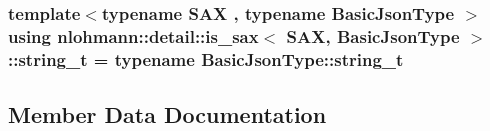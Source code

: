 \subsubsection[{\texorpdfstring{string\+\_\+t}{string_t}}]{\setlength{\rightskip}{0pt plus 5cm}template$<$typename S\+AX , typename Basic\+Json\+Type $>$ using {\bf nlohmann\+::detail\+::is\+\_\+sax}$<$ S\+AX, Basic\+Json\+Type $>$\+::{\bf string\+\_\+t} =  typename Basic\+Json\+Type\+::string\+\_\+t\hspace{0.3cm}{\ttfamily [private]}}\hypertarget{structnlohmann_1_1detail_1_1is__sax_ad8e2e1427ff43536370b6db6ab83ae50}{}\label{structnlohmann_1_1detail_1_1is__sax_ad8e2e1427ff43536370b6db6ab83ae50}


\subsection{Member Data Documentation}
